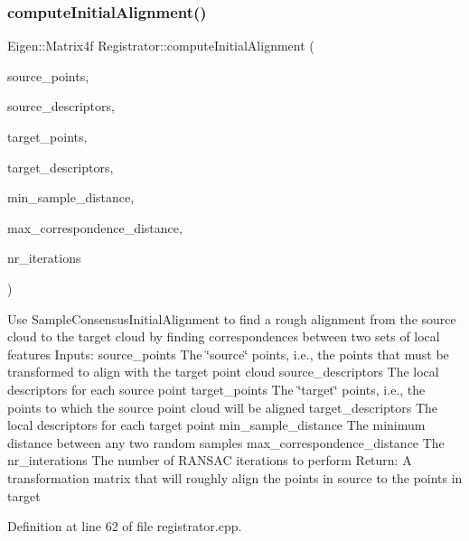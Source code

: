\subsubsection{\texorpdfstring{compute\+Initial\+Alignment()}{computeInitialAlignment()}}
{\footnotesize\ttfamily Eigen\+::\+Matrix4f Registrator\+::compute\+Initial\+Alignment (\begin{DoxyParamCaption}\item[{const pcl\+::\+Point\+Cloud$<$ pcl\+::\+Point\+X\+Y\+Z\+R\+GB $>$\+::Ptr \&}]{source\+\_\+points,  }\item[{const pcl\+::\+Point\+Cloud$<$ pcl\+::\+F\+P\+F\+H\+Signature33 $>$\+::Ptr \&}]{source\+\_\+descriptors,  }\item[{const pcl\+::\+Point\+Cloud$<$ pcl\+::\+Point\+X\+Y\+Z\+R\+GB $>$\+::Ptr \&}]{target\+\_\+points,  }\item[{const pcl\+::\+Point\+Cloud$<$ pcl\+::\+F\+P\+F\+H\+Signature33 $>$\+::Ptr \&}]{target\+\_\+descriptors,  }\item[{float}]{min\+\_\+sample\+\_\+distance,  }\item[{float}]{max\+\_\+correspondence\+\_\+distance,  }\item[{int}]{nr\+\_\+iterations }\end{DoxyParamCaption})}

Use Sample\+Consensus\+Initial\+Alignment to find a rough alignment from the source cloud to the target cloud by finding correspondences between two sets of local features Inputs\+: source\+\_\+points The \char`\"{}source\char`\"{} points, i.\+e., the points that must be transformed to align with the target point cloud source\+\_\+descriptors The local descriptors for each source point target\+\_\+points The \char`\"{}target\char`\"{} points, i.\+e., the points to which the source point cloud will be aligned target\+\_\+descriptors The local descriptors for each target point min\+\_\+sample\+\_\+distance The minimum distance between any two random samples max\+\_\+correspondence\+\_\+distance The nr\+\_\+interations The number of R\+A\+N\+S\+AC iterations to perform Return\+: A transformation matrix that will roughly align the points in source to the points in target 

Definition at line 62 of file registrator.\+cpp.

\hypertarget{class_registrator_af9074af8efbd597162ccfa45b8970656}{}\label{class_registrator_af9074af8efbd597162ccfa45b8970656} 
